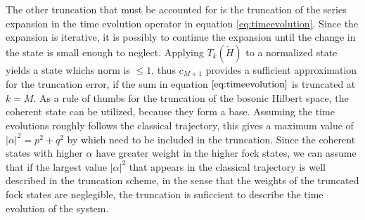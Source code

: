 The other truncation that must be accounted for is the truncation of the series expansion in the time evolution operator in equation \eqref{eq:timeevolution}.
Since the expansion is iterative, it is possibly to continue the expansion until the change in the state is small enough to neglect.
Applying $T_k(\tilde H)$ to a normalized state yields a state whichs norm is $\leq 1$, thus $c_{M+1}$ provides a sufficient approximation for the truncation error, if the sum in equation $\eqref{eq:timeevolution}$ is truncated at $k = M$.
As a rule of thumbs for the truncation of the bosonic Hilbert space, the coherent state can be utilized, because they form a base.
Assuming the time evolutions roughly follows the classical trajectory, this gives a maximum value of $|\alpha|^2 = p^2 + q^2$ by which need to be included in the truncation.
Since the coherent states with higher $\alpha$ have greater weight in the higher fock states, we can assume that if the largest value $|\alpha|^2$ that appears in the classical trajectory is well described in the truncation scheme, in the sense that the weights of the truncated fock states are neglegible, the truncation is suficcient to describe the time evolution of the system.

